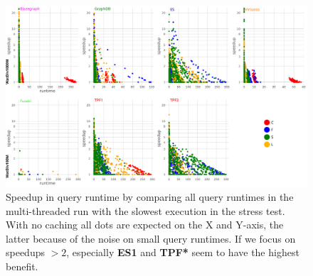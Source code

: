 %

\begin{figure}[htbp!]
	\centering
	\includegraphics[width=0.9\linewidth]{imgs/Fig08_Watdiv_caching}
	\caption{Speedup in query runtime by comparing all query runtimes in the multi-threaded run with the slowest execution in the stress test. With no caching all dots are expected on the X and Y-axis, the latter because of the noise on small query runtimes. If we focus on speedups $> 2$, especially \textbf{ES1} and \textbf{TPF*} seem to have the highest benefit.  }
	\label{fig:Fig08_Watdiv_caching}
\end{figure}

